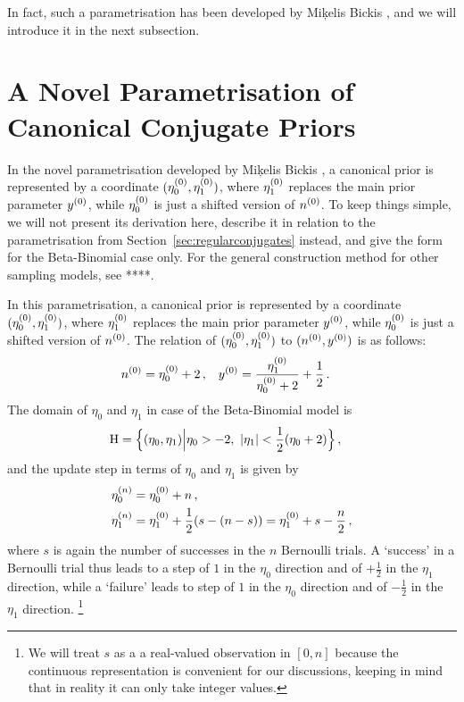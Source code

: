 In fact, such a parametrisation has been developed by Mi\c{k}elis Bickis \cite[$+$ paper ms ref***]{2011:bickis:geomip},
and we will introduce it in the next subsection.


\section{A Novel Parametrisation of Canonical Conjugate Priors}
\label{sec:miksworld}

In the novel parametrisation developed by Mi\c{k}elis Bickis \cite[$+$ paper ms ref***]{2011:bickis:geomip},
a canonical prior is represented by a coordinate $(\eta_0^{(0)},\eta_1^{(0)})$,
where $\eta_1^{(0)}$ replaces the main prior parameter $y^{(0)}$,
while $\eta_0^{(0)}$ is just a shifted version of $n^{(0)}$.
To keep things simple, we will not present its derivation here,
describe it in relation to the parametrisation from Section~\ref{sec:regularconjugates} instead,
and give the form for the Beta-Binomial case only.
For the general construction method for other sampling models, see ****. 

In this parametrisation, a canonical prior is represented by a coordinate $(\eta_0^{(0)},\eta_1^{(0)})$,
where $\eta_1^{(0)}$ replaces the main prior parameter $y^{(0)}$,
while $\eta_0^{(0)}$ is just a shifted version of $n^{(0)}$.
The relation of $(\eta_0^{(0)},\eta_1^{(0)})$ to $(n^{(0)}, y^{(0)})$ is as follows:
\begin{align}
\label{eq:trafotony}
n^{(0)} &= \eta_0^{(0)} + 2\,, &
y^{(0)} &= \frac{\eta_1^{(0)}}{\eta_0^{(0)} + 2} + \frac{1}{2}\,.
\end{align}
The domain of $\eta_0$ and $\eta_1$ in case of the Beta-Binomial model is
\begin{align}
\label{eq:eta-domain}
\mathrm{H} &= \Big\{ (\eta_0,\eta_1) \Big| \eta_0 > -2,\ |\eta_1| < \frac{1}{2}(\eta_0 + 2) \Big.\Big\}\,,
\end{align}
and the update step in terms of $\eta_0$ and $\eta_1$ is given by
\begin{equation}
\label{eq:eta-update}
\begin{aligned}
\eta_0^{(n)} &= \eta_0^{(0)} + n\,, \\
\eta_1^{(n)} &= \eta_1^{(0)} + \frac{1}{2}(s - (n-s)) = \eta_1^{(0)} + s - \frac{n}{2}\,,
\end{aligned}
\end{equation}
where $s$ is again the number of successes in the $n$ Bernoulli trials.
A `success' in a Bernoulli trial thus
leads to a step of $1$ in the $\eta_0$ direction and of $+\frac{1}{2}$ in the $\eta_1$ direction,
while a `failure'
leads to step of $1$ in the $\eta_0$ direction and of $-\frac{1}{2}$ in the $\eta_1$ direction.%
\footnote{We will treat $s$ as a a real-valued observation in $[0,n]$
because the continuous representation is convenient for our discussions,
keeping in mind that in reality it can only take integer values.}

